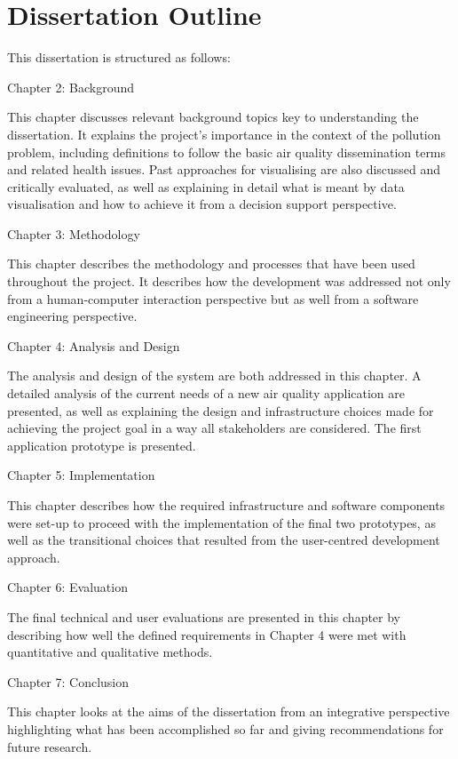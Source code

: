 \section{Dissertation Outline}
This dissertation is structured as follows: 
 
\bigskip
 Chapter 2: Background
\bigskip

This chapter discusses relevant background topics key to understanding the dissertation. It explains the project's importance in the context of the pollution problem, including definitions to follow the basic air quality dissemination terms and related health issues. Past approaches for visualising are also discussed and critically evaluated, as well as explaining in detail what is meant by data visualisation and how to achieve it from a decision support perspective.
 
\bigskip
 Chapter 3: Methodology
\bigskip
  
This chapter describes the methodology and processes that have been used throughout the project. It describes how the development was addressed not only from a human-computer interaction perspective but as well from a software engineering perspective. 
  
\bigskip  
 Chapter 4: Analysis and Design
\bigskip

The analysis and design of the system are  both addressed in this chapter. A detailed analysis of the current needs of a new air quality application are presented, as well as explaining the design and infrastructure choices made for achieving the project goal in a way all stakeholders are considered. The first application prototype is presented.
 
\bigskip
Chapter 5: Implementation
\bigskip

This chapter describes how the required infrastructure and software components were set-up to proceed with the implementation of the final two prototypes, as well as the transitional choices that resulted from the user-centred development approach.

\bigskip
 Chapter 6: Evaluation
\bigskip

The final technical and user evaluations are presented in this chapter by describing how well the defined requirements in Chapter 4 were met with quantitative and qualitative methods.

\bigskip
 Chapter 7: Conclusion
\bigskip

This chapter looks at the aims of the dissertation from an integrative perspective highlighting what has been accomplished so far and giving recommendations for future research.